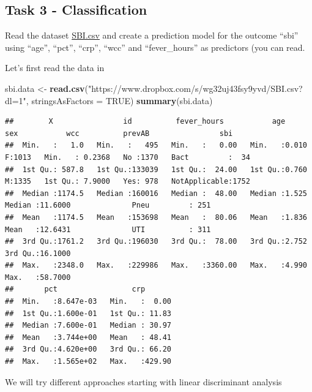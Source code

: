 \documentclass[
]{book}
\newenvironment{Shaded}{\begin{snugshade}}{\end{snugshade}}
\newcommand{\AttributeTok}[1]{\textcolor[rgb]{0.13,0.29,0.53}{#1}}
\newcommand{\ConstantTok}[1]{\textcolor[rgb]{0.56,0.35,0.01}{#1}}
\newcommand{\FunctionTok}[1]{\textcolor[rgb]{0.13,0.29,0.53}{\textbf{#1}}}
\newcommand{\NormalTok}[1]{#1}
\newcommand{\OtherTok}[1]{\textcolor[rgb]{0.56,0.35,0.01}{#1}}
\newcommand{\StringTok}[1]{\textcolor[rgb]{0.31,0.60,0.02}{#1}}
\begin{document}
\subsection*{Task 3 - Classification}\label{task-3---classification}

Read the dataset \href{https://www.dropbox.com/s/wg32uj43fsy9yvd/SBI.csv?dl=0}{SBI.csv}
and create a prediction model for the outcome ``sbi'' using ``age'', ``pct'', ``crp'',
``wcc'' and ``fever\_hours'' as predictors (you can read.

Let's first read the data in

\begin{Shaded}
\begin{Highlighting}[]
\NormalTok{sbi.data     }\OtherTok{\textless{}{-}} 
  \FunctionTok{read.csv}\NormalTok{(}\StringTok{"https://www.dropbox.com/s/wg32uj43fsy9yvd/SBI.csv?dl=1"}\NormalTok{, }
           \AttributeTok{stringsAsFactors =} \ConstantTok{TRUE}\NormalTok{)}
\FunctionTok{summary}\NormalTok{(sbi.data)}
\end{Highlighting}
\end{Shaded}

\begin{verbatim}
##        X                id          fever_hours           age        sex           wcc          prevAB                sbi      
##  Min.   :   1.0   Min.   :   495   Min.   :   0.00   Min.   :0.010   F:1013   Min.   : 0.2368   No :1370   Bact         :  34  
##  1st Qu.: 587.8   1st Qu.:133039   1st Qu.:  24.00   1st Qu.:0.760   M:1335   1st Qu.: 7.9000   Yes: 978   NotApplicable:1752  
##  Median :1174.5   Median :160016   Median :  48.00   Median :1.525            Median :11.6000              Pneu         : 251  
##  Mean   :1174.5   Mean   :153698   Mean   :  80.06   Mean   :1.836            Mean   :12.6431              UTI          : 311  
##  3rd Qu.:1761.2   3rd Qu.:196030   3rd Qu.:  78.00   3rd Qu.:2.752            3rd Qu.:16.1000                                  
##  Max.   :2348.0   Max.   :229986   Max.   :3360.00   Max.   :4.990            Max.   :58.7000                                  
##       pct                 crp        
##  Min.   :8.647e-03   Min.   :  0.00  
##  1st Qu.:1.600e-01   1st Qu.: 11.83  
##  Median :7.600e-01   Median : 30.97  
##  Mean   :3.744e+00   Mean   : 48.41  
##  3rd Qu.:4.620e+00   3rd Qu.: 66.20  
##  Max.   :1.565e+02   Max.   :429.90
\end{verbatim}

We will try different approaches starting with linear discriminant analysis
\end{document}
